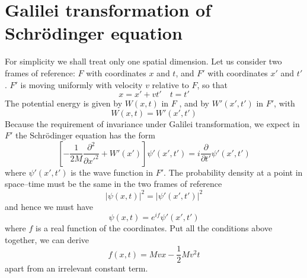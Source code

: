 \documentclass[cyan]{elegantnote}
\begin{document}
\section{Galilei transformation of Schr\"{o}dinger equation}
For simplicity we shall treat only one spatial dimension. Let us consider two frames of reference: $F$ with coordinates $x$ and $t$, and $F'$ with coordinates $x'$ and $t'$. $F'$ is moving uniformly with velocity $v$ relative to $F$, so that
\[x = x' + vt' \quad t=t'\]
The potential energy is given by $W(x,t)$ in $F$ , and by $W'(x',t')$ in $F'$, with
\[W(x,t) = W'(x',t')\]
Because the requirement of invariance under Galilei transformation, we expect in $F'$ the  Schr\"{o}dinger equation has the form
\[ \left[- \frac{1}{2M} \frac{\partial^2}{\partial x'^2} + W'(x') \right] \psi'(x',t') = i\frac{\partial}{\partial t'}\psi'(x',t')\]
where $\psi'(x',t')$ is the wave function in $F'$.
The probability density at a point in space–time must be the same in the two frames of reference
\[|\psi(x,t)|^2 = |\psi'(x',t')|^2\]
and hence we must have
\[\psi(x,t) = e^{if}\psi'(x',t')\]
where $f$ is a real function of the coordinates.
Put all the conditions above together, we can derive
\[f(x,t) = Mvx - \frac{1}{2} Mv^2t\]
apart from an irrelevant constant term.
\end{document}

